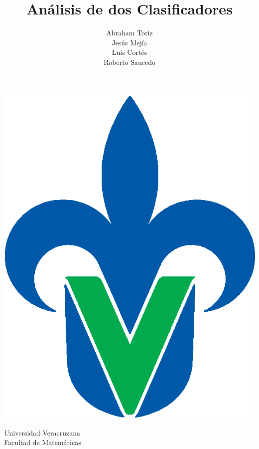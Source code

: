\documentclass[11pt,letterpaper,reqno]{article}
\title{Análisis de dos Clasificadores}
\author{Abraham Toriz\\ Jesús Mejía\\ Luis Cortés\\ Roberto Saucedo}
\begin{document}
\pagestyle{empty}
\begin{minipage}{.15\textwidth}
	\includegraphics[scale=.22]{uv.eps}
\end{minipage}
\begin{minipage}{.7\textwidth}
\centering
{\huge \sc Universidad Veracruzana}\\
{\LARGE \sc Facultad de Matemáticas}
\end{minipage}
\end{document}
